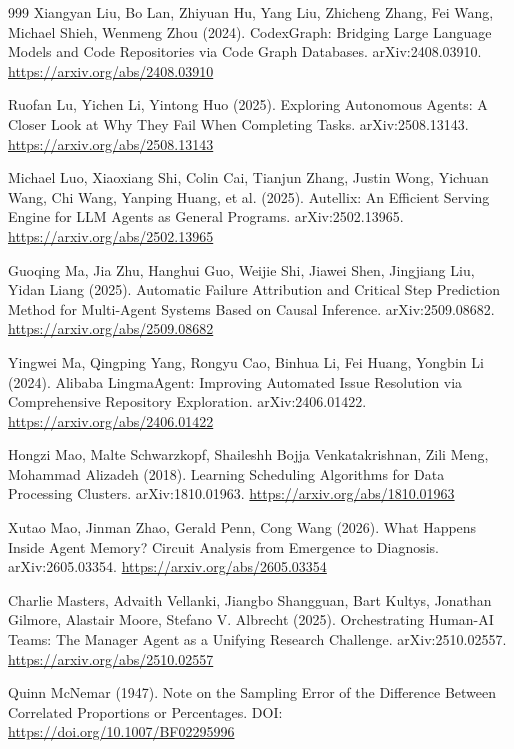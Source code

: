 \begin{thebibliography}{999}
 Xiangyan Liu, Bo Lan, Zhiyuan Hu, Yang Liu, Zhicheng Zhang, Fei Wang, Michael Shieh, Wenmeng Zhou (2024). CodexGraph: Bridging Large Language Models and Code Repositories via Code Graph Databases. arXiv:2408.03910. \url{https://arxiv.org/abs/2408.03910}

 Ruofan Lu, Yichen Li, Yintong Huo (2025). Exploring Autonomous Agents: A Closer Look at Why They Fail When Completing Tasks. arXiv:2508.13143. \url{https://arxiv.org/abs/2508.13143}

 Michael Luo, Xiaoxiang Shi, Colin Cai, Tianjun Zhang, Justin Wong, Yichuan Wang, Chi Wang, Yanping Huang, et al. (2025). Autellix: An Efficient Serving Engine for LLM Agents as General Programs. arXiv:2502.13965. \url{https://arxiv.org/abs/2502.13965}

 Guoqing Ma, Jia Zhu, Hanghui Guo, Weijie Shi, Jiawei Shen, Jingjiang Liu, Yidan Liang (2025). Automatic Failure Attribution and Critical Step Prediction Method for Multi-Agent Systems Based on Causal Inference. arXiv:2509.08682. \url{https://arxiv.org/abs/2509.08682}

 Yingwei Ma, Qingping Yang, Rongyu Cao, Binhua Li, Fei Huang, Yongbin Li (2024). Alibaba LingmaAgent: Improving Automated Issue Resolution via Comprehensive Repository Exploration. arXiv:2406.01422. \url{https://arxiv.org/abs/2406.01422}

 Hongzi Mao, Malte Schwarzkopf, Shaileshh Bojja Venkatakrishnan, Zili Meng, Mohammad Alizadeh (2018). Learning Scheduling Algorithms for Data Processing Clusters. arXiv:1810.01963. \url{https://arxiv.org/abs/1810.01963}

 Xutao Mao, Jinman Zhao, Gerald Penn, Cong Wang (2026). What Happens Inside Agent Memory? Circuit Analysis from Emergence to Diagnosis. arXiv:2605.03354. \url{https://arxiv.org/abs/2605.03354}

 Charlie Masters, Advaith Vellanki, Jiangbo Shangguan, Bart Kultys, Jonathan Gilmore, Alastair Moore, Stefano V. Albrecht (2025). Orchestrating Human-AI Teams: The Manager Agent as a Unifying Research Challenge. arXiv:2510.02557. \url{https://arxiv.org/abs/2510.02557}

 Quinn McNemar (1947). Note on the Sampling Error of the Difference Between Correlated Proportions or Percentages. DOI: \url{https://doi.org/10.1007/BF02295996}


\end{thebibliography}
